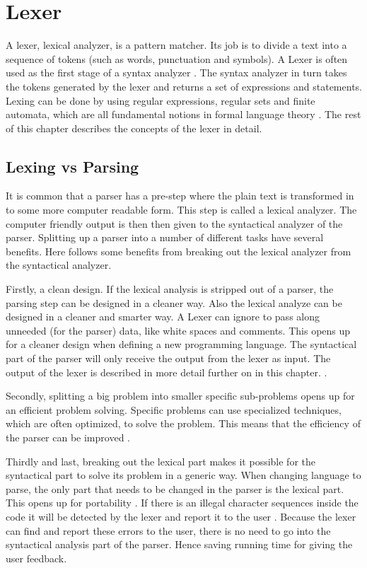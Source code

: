 \chapter{Lexer \label{chap:lexer}}
A lexer, lexical analyzer, is a pattern matcher. Its job is to divide a text
into a sequence of tokens (such as words, punctuation and symbols). A Lexer is
often used as the first stage of a syntax analyzer \cite{sebesta2012}. The syntax
analyzer in turn takes the tokens generated by the lexer and returns a set of
expressions and statements. Lexing can be done by using regular expressions,
regular sets and finite automata, which are all fundamental notions in
formal language theory \cite{Aho1990}. The rest of this chapter describes the
concepts of the lexer in detail.

\section{Lexing vs Parsing}
It is common that a parser has a pre-step where the plain text is transformed
in to some more computer readable form. This step is called a lexical analyzer.
The computer friendly output is then then given to the syntactical analyzer of
the parser. Splitting up a parser into a number of different tasks have several
benefits. Here follows some benefits from breaking out the lexical analyzer from
the syntactical analyzer.

Firstly, a clean design. If the lexical analysis is stripped out of a parser,
the parsing step can be designed in a cleaner way. Also the lexical analyze can
be designed in a cleaner and smarter way. A Lexer can ignore to pass along
unneeded (for the parser) data, like white spaces and comments. This opens up
for a cleaner design when defining a new programming language. The syntactical
part of the parser will only receive the output from the lexer as input. The 
output of the lexer is described in more detail further on in this chapter.
\cite{Aho2006}.

Secondly, splitting a big problem into smaller specific sub-problems opens up
for an efficient problem solving. Specific problems can use specialized
techniques, which are often optimized, to solve the problem. This means that
the efficiency of the parser can be improved \cite{Aho2006}.

Thirdly and last, breaking out the lexical part makes it possible for the
syntactical part to solve its problem in a generic way. When changing language
to parse, the only part that needs to be changed in the parser is the lexical
part. This opens up for portability \cite{Aho2006}. If there is an illegal
character sequences inside the code it will be detected by the lexer and
report it to the user \cite{sebesta2012}. Because the lexer can find and report
these errors to the user, there is no need to go into the syntactical analysis
part of the parser. Hence saving running time for giving the user feedback.

